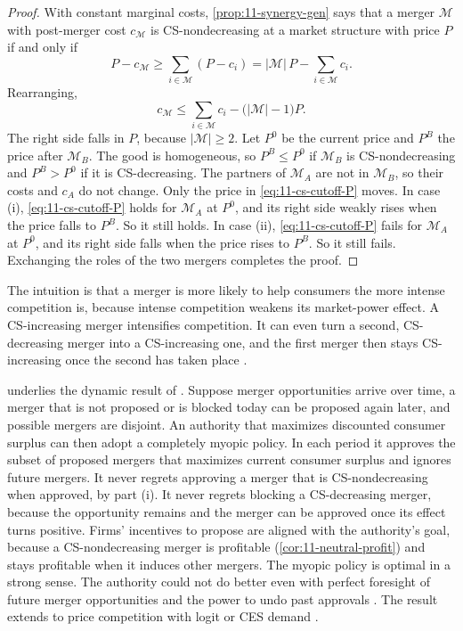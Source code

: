 \begin{proof}
With constant marginal costs, \cref{prop:11-synergy-gen} says that a merger $\mathcal{M}$ with post-merger cost
$c_{\mathcal{M}}$ is CS-nondecreasing at a market structure with price $P$ if and only if
\begin{equation*}
P - c_{\mathcal{M}} \ge \sum_{i \in \mathcal{M}}(P - c_i) = |\mathcal{M}|\,P - \sum_{i \in \mathcal{M}}c_i .
\end{equation*}
Rearranging,
\begin{equation}\label{eq:11-cs-cutoff-P}
c_{\mathcal{M}} \le \sum_{i \in \mathcal{M}}c_i - \big(|\mathcal{M}| - 1\big)P .
\end{equation}
The right side falls in $P$, because $|\mathcal{M}| \ge 2$. Let $P^0$ be the current price and $P^B$ the price after
$\mathcal{M}_B$. The good is homogeneous, so $P^B \le P^0$ if $\mathcal{M}_B$ is CS-nondecreasing and $P^B > P^0$ if it is
CS-decreasing. The partners of $\mathcal{M}_A$ are not in $\mathcal{M}_B$, so their costs and $c_A$ do not change.
Only the price in \eqref{eq:11-cs-cutoff-P} moves. In case (i), \eqref{eq:11-cs-cutoff-P} holds for $\mathcal{M}_A$ at
$P^0$, and its right side weakly rises when the price falls to $P^B$. So it still holds. In case (ii),
\eqref{eq:11-cs-cutoff-P} fails for $\mathcal{M}_A$ at $P^0$, and its right side falls when the price rises to $P^B$. So
it still fails. Exchanging the roles of the two mergers completes the proof.
\end{proof}

The intuition is that a merger is more likely to help consumers the more intense competition is, because intense
competition weakens its market-power effect. A CS-increasing merger intensifies competition. It can even turn a second,
CS-decreasing merger into a CS-increasing one, and the first merger then stays CS-increasing once the second has taken
place \citep[p.~233]{AskerNocke2021}.

 underlies the dynamic result of \citet{NockeWhinston2010}. Suppose merger opportunities
arrive over time, a merger that is not proposed or is blocked today can be proposed again later, and possible mergers
are disjoint. An authority that maximizes discounted consumer surplus can then adopt a completely myopic policy. In each
period it approves the subset of proposed mergers that maximizes current consumer surplus and ignores future mergers.
It never regrets approving a merger that is CS-nondecreasing when approved, by part (i). It never regrets blocking a
CS-decreasing merger, because the opportunity remains and the merger can be approved once its effect turns positive.
Firms' incentives to propose are aligned with the authority's goal, because a CS-nondecreasing merger is profitable
(\cref{cor:11-neutral-profit}) and stays profitable when it induces other mergers. The myopic policy is optimal in a
strong sense. The authority could not do better even with perfect foresight of future merger opportunities and the
power to undo past approvals \citep[p.~233]{AskerNocke2021}. The result extends to price competition with logit or CES
demand \citep{NockeSchutz2019}.

